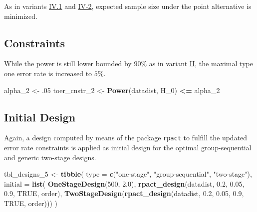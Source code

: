 \documentclass[
]{book}
\newenvironment{Shaded}{\begin{snugshade}}{\end{snugshade}}
\newcommand{\DataTypeTok}[1]{\textcolor[rgb]{0.13,0.29,0.53}{#1}}
\newcommand{\DecValTok}[1]{\textcolor[rgb]{0.00,0.00,0.81}{#1}}
\newcommand{\FloatTok}[1]{\textcolor[rgb]{0.00,0.00,0.81}{#1}}
\newcommand{\KeywordTok}[1]{\textcolor[rgb]{0.13,0.29,0.53}{\textbf{#1}}}
\newcommand{\NormalTok}[1]{#1}
\newcommand{\OperatorTok}[1]{\textcolor[rgb]{0.81,0.36,0.00}{\textbf{#1}}}
\newcommand{\OtherTok}[1]{\textcolor[rgb]{0.56,0.35,0.01}{#1}}
\newcommand{\StringTok}[1]{\textcolor[rgb]{0.31,0.60,0.02}{#1}}
\begin{document}
As in variants \protect\hyperlink{variantIV_1}{IV.1} and \protect\hyperlink{variantIV_2}{IV-2},
expected sample size under the point alternative is minimized.

\hypertarget{constraints-9}{%
\subsection{Constraints}\label{constraints-9}}

While the power is still lower bounded by \(90\%\) as in variant \protect\hyperlink{variantIV_2}{II},
the maximal type one error rate is increased to \(5\%\).

\begin{Shaded}
\begin{Highlighting}[]
\NormalTok{alpha\_}\DecValTok{2}\NormalTok{      \textless{}{-}}\StringTok{ }\FloatTok{.05}
\NormalTok{toer\_cnstr\_}\DecValTok{2}\NormalTok{ \textless{}{-}}\StringTok{ }\KeywordTok{Power}\NormalTok{(datadist, H\_}\DecValTok{0}\NormalTok{) }\OperatorTok{\textless{}=}\StringTok{ }\NormalTok{alpha\_}\DecValTok{2}
\end{Highlighting}
\end{Shaded}

\hypertarget{initial-design-7}{%
\subsection{Initial Design}\label{initial-design-7}}

Again, a design computed by means of the package \texttt{rpact} to fulfill
the updated error rate constraints is applied as initial design for the
optimal group-sequential and generic two-stage designs.

\begin{Shaded}
\begin{Highlighting}[]
\NormalTok{tbl\_designs\_}\DecValTok{5}\NormalTok{ \textless{}{-}}\StringTok{ }\KeywordTok{tibble}\NormalTok{(}
    \DataTypeTok{type    =} \KeywordTok{c}\NormalTok{(}\StringTok{"one{-}stage"}\NormalTok{, }\StringTok{"group{-}sequential"}\NormalTok{, }\StringTok{"two{-}stage"}\NormalTok{),}
    \DataTypeTok{initial =} \KeywordTok{list}\NormalTok{(}
        \KeywordTok{OneStageDesign}\NormalTok{(}\DecValTok{500}\NormalTok{, }\FloatTok{2.0}\NormalTok{),}
        \KeywordTok{rpact\_design}\NormalTok{(datadist, }\FloatTok{0.2}\NormalTok{, }\FloatTok{0.05}\NormalTok{, }\FloatTok{0.9}\NormalTok{, }\OtherTok{TRUE}\NormalTok{, order),}
        \KeywordTok{TwoStageDesign}\NormalTok{(}\KeywordTok{rpact\_design}\NormalTok{(datadist, }\FloatTok{0.2}\NormalTok{, }\FloatTok{0.05}\NormalTok{, }\FloatTok{0.9}\NormalTok{, }\OtherTok{TRUE}\NormalTok{, order))) )}
\end{Highlighting}
\end{Shaded}
\end{document}
